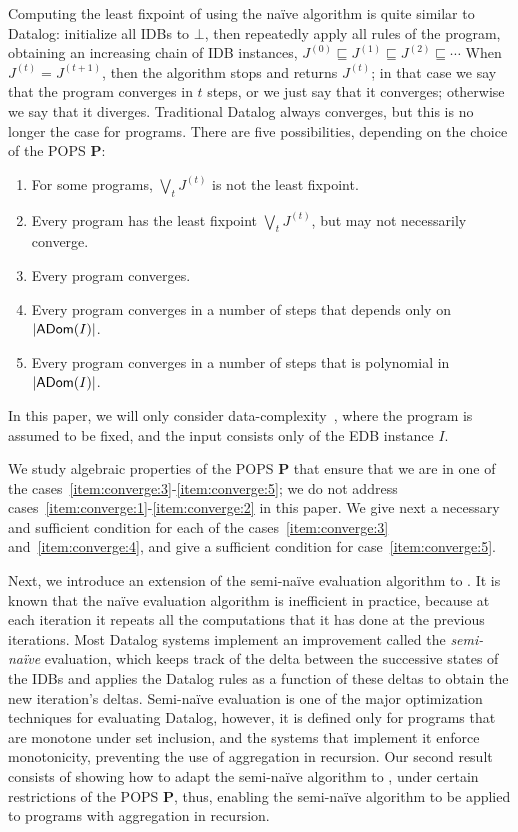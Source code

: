 Computing the least fixpoint of \datalogo using the na\"ive algorithm
 is quite similar to Datalog:
initialize all IDBs to $\bot$,
then repeatedly apply all rules of the \datalogo program, obtaining an
increasing chain of IDB instances,
$J^{(0)} \sqsubseteq J^{(1)} \sqsubseteq J^{(2)} \sqsubseteq \cdots$
When $J^{(t)} = J^{(t+1)}$, then the algorithm stops and returns
$J^{(t)}$; in that case we say that the \datalogo program converges in
$t$ steps, or we just say that it converges; otherwise we say that it
diverges.  Traditional Datalog always converges, but this is no longer
the case for \datalogo programs.  There are five possibilities,
depending on the choice of the POPS $\bm P$:
%
\begin{enumerate}[label=(\roman*)]
\item \label{item:converge:1} For some \datalogo programs, $\bigvee_t J^{(t)}$ is not the least fixpoint.
\item \label{item:converge:2} Every \datalogo program has the least fixpoint $\bigvee_t J^{(t)}$, but may not necessarily converge.
\item \label{item:converge:3} Every \datalogo program converges.
\item \label{item:converge:4} Every \datalogo program converges in a
  number of steps that depends only on $|\textsf{ADom}(I)|$.
\item \label{item:converge:5} Every \datalogo program converges in a
  number of steps that is polynomial in $|\textsf{ADom}(I)|$.
\end{enumerate}
%
In this paper, we will only consider
data-complexity~\cite{DBLP:conf/stoc/Vardi82}, where the \datalogo
program is assumed to be fixed, and the input consists only of the EDB
instance $I$.

We study algebraic properties of the POPS $\bm P$ that ensure that we
are in one of the cases~\ref{item:converge:3}-\ref{item:converge:5};
we do not address cases~\ref{item:converge:1}-\ref{item:converge:2} in
this paper.  We give next a necessary and sufficient condition for
each of the cases~\ref{item:converge:3} and~\ref{item:converge:4}, and
give a sufficient condition for case~\ref{item:converge:5}.  

Next, we introduce an extension of the semi-na\"ive evaluation
algorithm to \datalogo.  It is known that the na\"ive evaluation
algorithm is inefficient in practice, because at each iteration it
repeats all the computations that it has done at the previous
iterations.  Most Datalog systems implement an improvement called the
{\em semi-na\"ive} evaluation, which keeps track of the delta between
the successive states of the IDBs and applies the Datalog rules as a
function of these deltas to obtain the new iteration's deltas.
Semi-na\"ive evaluation is one of the major optimization techniques
for evaluating Datalog, however, it is defined only for programs that
are monotone under set inclusion, and the systems that implement it
enforce monotonicity, preventing the use of aggregation in
recursion. Our second result consists of showing how to adapt the
semi-na\"ive algorithm to \datalogo, under certain restrictions of the
POPS $\bm P$, thus, enabling the semi-na\"ive algorithm to be applied
to programs with aggregation in recursion.

